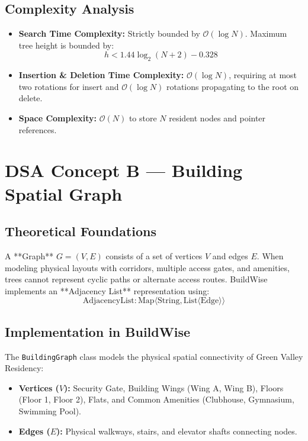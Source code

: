 \documentclass[12pt,a4paper]{article}
\begin{document}
\subsection{Complexity Analysis}
\begin{itemize}[leftmargin=1.5em]
    \item \textbf{Search Time Complexity:} Strictly bounded by $\mathcal{O}(\log N)$. Maximum tree height is bounded by:
    \begin{equation}
        h < 1.44 \log_2(N + 2) - 0.328
    \end{equation}
    \item \textbf{Insertion \& Deletion Time Complexity:} $\mathcal{O}(\log N)$, requiring at most two rotations for insert and $\mathcal{O}(\log N)$ rotations propagating to the root on delete.
    \item \textbf{Space Complexity:} $\mathcal{O}(N)$ to store $N$ resident nodes and pointer references.
\end{itemize}

\section{DSA Concept B --- Building Spatial Graph}

\subsection{Theoretical Foundations}
A **Graph** $G = (V, E)$ consists of a set of vertices $V$ and edges $E$. When modeling physical layouts with corridors, multiple access gates, and amenities, trees cannot represent cyclic paths or alternate access routes. BuildWise implements an **Adjacency List** representation using:
\begin{equation}
    \text{AdjacencyList}: \text{Map}\langle \text{String}, \text{List}\langle \text{Edge}\rangle\rangle
\end{equation}

\subsection{Implementation in BuildWise}
The \texttt{BuildingGraph} class models the physical spatial connectivity of Green Valley Residency:
\begin{itemize}[leftmargin=1.5em]
    \item \textbf{Vertices ($V$):} Security Gate, Building Wings (Wing A, Wing B), Floors (Floor 1, Floor 2), Flats, and Common Amenities (Clubhouse, Gymnasium, Swimming Pool).
    \item \textbf{Edges ($E$):} Physical walkways, stairs, and elevator shafts connecting nodes.
\end{itemize}
\end{document}

